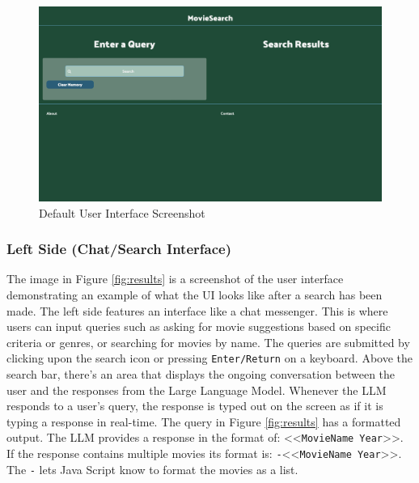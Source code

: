 \documentclass[journal]{IEEEtran}
\theoremstyle{mydefstyle}
\begin{document}
\begin{figure}
    \centering
    \includegraphics[width=1\linewidth]{doc//report//assets/Defaullt.png}
    \caption{Default User Interface Screenshot}
    \label{fig:default}
\end{figure}

\subsubsection{Left Side (Chat/Search Interface)}
The image in Figure \ref{fig:results} is a screenshot of the user interface demonstrating an example of what the UI looks like after a search has been made. The left side features an interface like a chat messenger. This is where users can input queries such as asking for movie suggestions based on specific criteria or genres, or searching for movies by name.  The queries are submitted by clicking upon the search icon or pressing \texttt{Enter/Return} on a keyboard. Above the search bar, there's an area that displays the ongoing conversation between the user and the responses from the Large Language Model. Whenever the LLM responds to a user's query, the response is typed out on the screen as if it is typing a response in real-time. The query in Figure \ref{fig:results} has a formatted output. The LLM provides a response in the format of: \textless\textless \texttt{MovieName Year}\textgreater\textgreater. If the response contains multiple movies its format is: \texttt{-}\textless\textless \texttt{MovieName Year}\textgreater\textgreater. The \texttt{-} lets Java Script know to format the movies as a list. 
\end{document}
